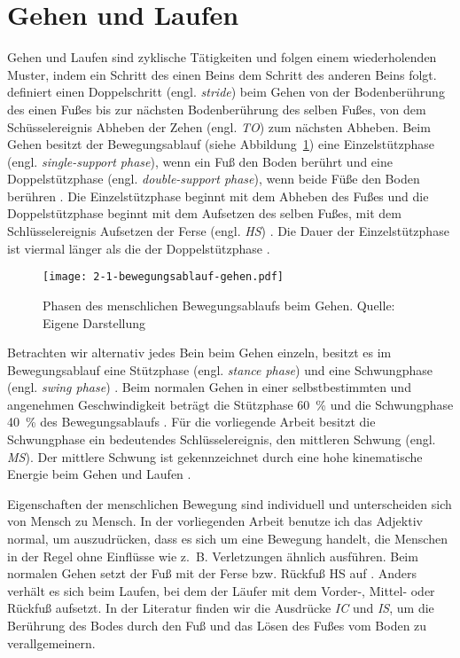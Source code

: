 \section{Gehen und Laufen}
\label{sec:gehen_und_laufen}

Gehen und Laufen sind zyklische Tätigkeiten und folgen einem wiederholenden Muster, indem ein Schritt des einen Beins dem Schritt des anderen Beins folgt. \citet[][S.~9]{Bartlett2007} definiert einen Doppelschritt (engl. \emph{stride}) beim Gehen von der Bodenberührung des einen Fußes bis zur nächsten Bodenberührung des selben Fußes, von dem Schüsselereignis Abheben der Zehen (engl. \emph{\ac{TO}}) zum nächsten Abheben. Beim Gehen besitzt der Bewegungsablauf (siehe Abbildung~\ref{fig:2_1_bewegungsablauf_gehen}) eine Einzelstützphase (engl. \emph{single-support phase}), wenn ein Fuß den Boden berührt und eine Doppelstützphase (engl. \emph{double-support phase}), wenn beide Füße den Boden berühren \citep[vgl.][]{Bartlett2007}. Die Einzelstützphase beginnt mit dem Abheben des Fußes und die Doppelstützphase beginnt mit dem Aufsetzen des selben Fußes, mit dem Schlüsselereignis Aufsetzen der Ferse (engl. \emph{\ac{HS}}) \citep[vgl.][]{Bartlett2007}. Die Dauer der Einzelstützphase ist viermal länger als die der Doppelstützphase \citep[vgl.][]{Bartlett2007}.

\begin{figure}[t]
	\centering
		\texttt{[image: 2-1-bewegungsablauf-gehen.pdf]}
	\caption[Phasen des menschlichen Bewegungsablaufs beim Gehen]{Phasen des menschlichen Bewegungsablaufs beim Gehen. Quelle: Eigene Darstellung}
	\label{fig:2_1_bewegungsablauf_gehen}
\end{figure}

Betrachten wir alternativ jedes Bein beim Gehen einzeln, besitzt es im Bewegungsablauf eine Stützphase (engl. \emph{stance phase}) und eine Schwungphase (engl. \emph{swing phase}) \citep[vgl.][]{Bartlett2007}. Beim normalen Gehen in einer selbstbestimmten und angenehmen Geschwindigkeit beträgt die Stützphase 60~\% und die Schwungphase 40~\% des Bewegungsablaufs \citep[vgl.][]{Bartlett2007}. Für die vorliegende Arbeit besitzt die Schwungphase ein bedeutendes Schlüsselereignis, den mittleren Schwung (engl. \emph{\ac{MS}}). Der mittlere Schwung ist gekennzeichnet durch eine hohe kinematische Energie beim Gehen und Laufen \citep[vgl.][]{Novacheck1998}.

Eigenschaften der menschlichen Bewegung sind individuell und unterscheiden sich von Mensch zu Mensch. In der vorliegenden Arbeit benutze ich das Adjektiv normal, um auszudrücken, dass es sich um eine Bewegung handelt, die Menschen in der Regel ohne Einflüsse wie z.~B. Verletzungen ähnlich ausführen. Beim normalen Gehen setzt der Fuß mit der Ferse bzw. Rückfuß \ac{HS} auf \citep[vgl.][S.~33]{Marquardt2011}. Anders verhält es sich beim Laufen, bei dem der Läufer mit dem Vorder-, Mittel- oder Rückfuß aufsetzt. In der Literatur finden wir die Ausdrücke \emph{\ac{IC}} und \emph{\ac{IS}}, um die Berührung des Bodes durch den Fuß und das Lösen des Fußes vom Boden zu verallgemeinern.

